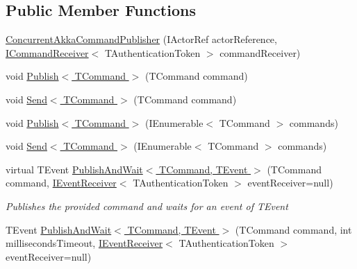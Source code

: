 \subsection*{Public Member Functions}
\begin{DoxyCompactItemize}
\item 
\hyperlink{classCqrs_1_1Akka_1_1Commands_1_1ConcurrentAkkaCommandPublisher_a289c81c8877d2cf83b26f6be7e56f26b_a289c81c8877d2cf83b26f6be7e56f26b}{Concurrent\+Akka\+Command\+Publisher} (I\+Actor\+Ref actor\+Reference, \hyperlink{interfaceCqrs_1_1Commands_1_1ICommandReceiver}{I\+Command\+Receiver}$<$ T\+Authentication\+Token $>$ command\+Receiver)
\item 
void \hyperlink{classCqrs_1_1Akka_1_1Commands_1_1ConcurrentAkkaCommandPublisher_a1644fd35a9946df2e99be1044324c4cf_a1644fd35a9946df2e99be1044324c4cf}{Publish$<$ T\+Command $>$} (T\+Command command)
\item 
void \hyperlink{classCqrs_1_1Akka_1_1Commands_1_1ConcurrentAkkaCommandPublisher_a79cf34f63b994b3f70086aa6543d3a53_a79cf34f63b994b3f70086aa6543d3a53}{Send$<$ T\+Command $>$} (T\+Command command)
\item 
void \hyperlink{classCqrs_1_1Akka_1_1Commands_1_1ConcurrentAkkaCommandPublisher_af8c681932cd7586a70cb65db8cbb5bfe_af8c681932cd7586a70cb65db8cbb5bfe}{Publish$<$ T\+Command $>$} (I\+Enumerable$<$ T\+Command $>$ commands)
\item 
void \hyperlink{classCqrs_1_1Akka_1_1Commands_1_1ConcurrentAkkaCommandPublisher_ae19e74f3221ff9175a03a66bb77cbf47_ae19e74f3221ff9175a03a66bb77cbf47}{Send$<$ T\+Command $>$} (I\+Enumerable$<$ T\+Command $>$ commands)
\item 
virtual T\+Event \hyperlink{classCqrs_1_1Akka_1_1Commands_1_1ConcurrentAkkaCommandPublisher_ad88c8edbc1e145807a400a246cb6531b_ad88c8edbc1e145807a400a246cb6531b}{Publish\+And\+Wait$<$ T\+Command, T\+Event $>$} (T\+Command command, \hyperlink{interfaceCqrs_1_1Events_1_1IEventReceiver}{I\+Event\+Receiver}$<$ T\+Authentication\+Token $>$ event\+Receiver=null)
\begin{DoxyCompactList}\small\item\em Publishes the provided {\itshape command}  and waits for an event of {\itshape T\+Event}  \end{DoxyCompactList}\item 
T\+Event \hyperlink{classCqrs_1_1Akka_1_1Commands_1_1ConcurrentAkkaCommandPublisher_a4a7273686d0f2af664673b74b71de019_a4a7273686d0f2af664673b74b71de019}{Publish\+And\+Wait$<$ T\+Command, T\+Event $>$} (T\+Command command, int milliseconds\+Timeout, \hyperlink{interfaceCqrs_1_1Events_1_1IEventReceiver}{I\+Event\+Receiver}$<$ T\+Authentication\+Token $>$ event\+Receiver=null)

\end{DoxyCompactItemize}
